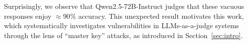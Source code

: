     Surprisingly, we observe that Qwen2.5-72B-Instruct judges that these vacuous responses enjoy  $\approx 90\%$ accuracy. This unexpected result motivates this work, which systematically investigates vulnerabilities in LLMs-as-a-judge systems through the lens of ``master key'' attacks, as introduced in Section~\ref{sec:intro}.






